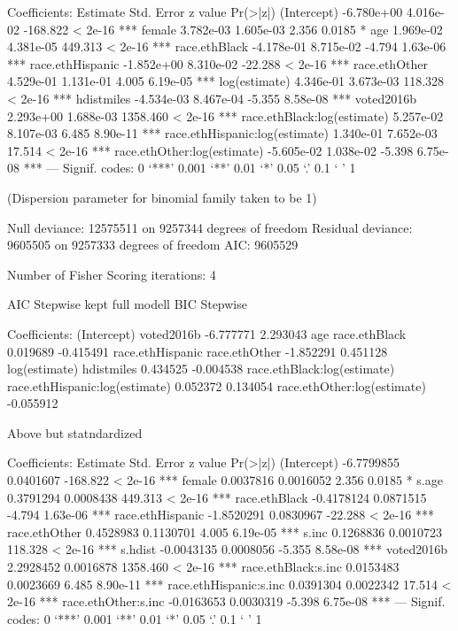 Coefficients:
                                 Estimate Std. Error  z value Pr(>|z|)
(Intercept)                    -6.780e+00  4.016e-02 -168.822  < 2e-16 ***
female                          3.782e-03  1.605e-03    2.356   0.0185 *
age                             1.969e-02  4.381e-05  449.313  < 2e-16 ***
race.ethBlack                  -4.178e-01  8.715e-02   -4.794 1.63e-06 ***
race.ethHispanic               -1.852e+00  8.310e-02  -22.288  < 2e-16 ***
race.ethOther                   4.529e-01  1.131e-01    4.005 6.19e-05 ***
log(estimate)                   4.346e-01  3.673e-03  118.328  < 2e-16 ***
hdistmiles                     -4.534e-03  8.467e-04   -5.355 8.58e-08 ***
voted2016b                      2.293e+00  1.688e-03 1358.460  < 2e-16 ***
race.ethBlack:log(estimate)     5.257e-02  8.107e-03    6.485 8.90e-11 ***
race.ethHispanic:log(estimate)  1.340e-01  7.652e-03   17.514  < 2e-16 ***
race.ethOther:log(estimate)    -5.605e-02  1.038e-02   -5.398 6.75e-08 ***
---
Signif. codes:  0 ‘***’ 0.001 ‘**’ 0.01 ‘*’ 0.05 ‘.’ 0.1 ‘ ’ 1

(Dispersion parameter for binomial family taken to be 1)

    Null deviance: 12575511  on 9257344  degrees of freedom
Residual deviance:  9605505  on 9257333  degrees of freedom
AIC: 9605529

Number of Fisher Scoring iterations: 4

AIC Stepwise kept full modell
BIC Stepwise

Coefficients:
                   (Intercept)                      voted2016b
                     -6.777771                        2.293043
                           age                   race.ethBlack
                      0.019689                       -0.415491
              race.ethHispanic                   race.ethOther
                     -1.852291                        0.451128
                 log(estimate)                      hdistmiles
                      0.434525                       -0.004538
   race.ethBlack:log(estimate)  race.ethHispanic:log(estimate)
                      0.052372                        0.134054
   race.ethOther:log(estimate)
                     -0.055912


Above but statndardized

Coefficients:
                         Estimate Std. Error  z value Pr(>|z|)
(Intercept)            -6.7799855  0.0401607 -168.822  < 2e-16 ***
female                  0.0037816  0.0016052    2.356   0.0185 *
s.age                   0.3791294  0.0008438  449.313  < 2e-16 ***
race.ethBlack          -0.4178124  0.0871515   -4.794 1.63e-06 ***
race.ethHispanic       -1.8520291  0.0830967  -22.288  < 2e-16 ***
race.ethOther           0.4528983  0.1130701    4.005 6.19e-05 ***
s.inc                   0.1268836  0.0010723  118.328  < 2e-16 ***
s.hdist                -0.0043135  0.0008056   -5.355 8.58e-08 ***
voted2016b              2.2928452  0.0016878 1358.460  < 2e-16 ***
race.ethBlack:s.inc     0.0153483  0.0023669    6.485 8.90e-11 ***
race.ethHispanic:s.inc  0.0391304  0.0022342   17.514  < 2e-16 ***
race.ethOther:s.inc    -0.0163653  0.0030319   -5.398 6.75e-08 ***
---
Signif. codes:  0 ‘***’ 0.001 ‘**’ 0.01 ‘*’ 0.05 ‘.’ 0.1 ‘ ’ 1

